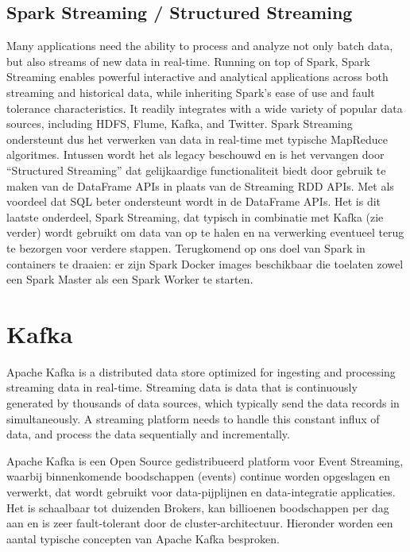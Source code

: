 \subsection{Spark Streaming / Structured Streaming}
Many applications need the ability to process and analyze not only batch data, but also streams of new data in real-time. Running on top of Spark, Spark Streaming enables powerful interactive and analytical applications across both streaming and historical data, while inheriting Spark’s ease of use and fault tolerance characteristics. It readily integrates with a wide variety of popular data sources, including HDFS, Flume, Kafka, and Twitter.\autocite{databricks2023}
\newline
\newline
Spark Streaming ondersteunt dus het verwerken van data in real-time met typische MapReduce algoritmes. Intussen wordt het als legacy beschouwd en is het vervangen door ``Structured Streaming'' dat gelijkaardige functionaliteit biedt door gebruik te maken van de DataFrame APIs in plaats van de Streaming RDD APIs. Met als voordeel dat SQL beter ondersteunt wordt in de DataFrame APIs.
\textcite{Buuck2022}
\newline
\newline
Het is dit laatste onderdeel, Spark Streaming, dat typisch in combinatie met Kafka (zie verder) wordt gebruikt om data van op te halen en na verwerking eventueel terug te bezorgen voor verdere stappen.
\newline
\newline
\newline
Terugkomend op ons doel van Spark in containers te draaien: er zijn Spark Docker images beschikbaar die toelaten zowel een Spark Master als een Spark Worker te starten.


\section{Kafka}
Apache Kafka is a distributed data store optimized for ingesting and processing streaming data in real-time. Streaming data is data that is continuously generated by thousands of data sources, which typically send the data records in simultaneously. A streaming platform needs to handle this constant influx of data, and process the data sequentially and incrementally.
\autocite{AwsAmazon2023b}

Apache Kafka is een Open Source gedistribueerd platform voor Event Streaming, waarbij binnenkomende boodschappen (events) continue worden opgeslagen en verwerkt, dat wordt gebruikt voor data-pijplijnen en data-integratie applicaties. Het is schaalbaar tot duizenden Brokers, kan billioenen boodschappen per dag aan en is zeer fault-tolerant door de cluster-architectuur. Hieronder worden een aantal typische concepten van Apache Kafka besproken.
\textcite{ASF2022b}

